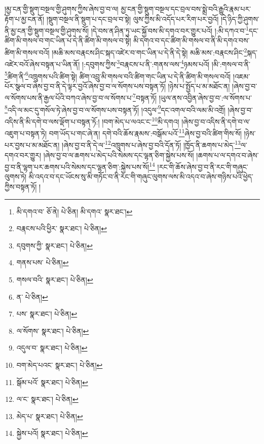 །མྱ་ངན་གྱི་སྡུག་བསྔལ་གྱི་ཤུགས་ཀྱིས་ཞེས་བྱ་བ་ལ། མྱ་ངན་གྱི་སྡུག་བསྔལ་དང་བྲལ་བས་སྨྲེ་བའི་རྒྱུའི་རྣམ་པར་རྟོག་པ་མྱ་ངན་ནོ། །སྡུག་བསྔལ་ནི་སྡུག་པ་དང་བྲལ་བ་སྟེ། ལུས་ཀྱིས་མི་འདོད་པར་རིག་པར་བྱའོ། །དེ་ཉིད་ཀྱི་ཤུགས་ནི་མྱ་ངན་གྱི་སྡུག་བསྔལ་གྱི་ཤུགས་སོ། །དེ་བས་ན་ཤིན་ཏུ་ཡང་སྐྱོ་བས་མི་དགའ་བར་གྱུར་པའོ། །:མི་དཀའ་བ་\footnote{མི་དགའ་བ་  ཅོ་ནེ།  པེ་ཅིན། མི་དགའ་  སྣར་ཐང་། }དང་ཚིག་མི་གསལ་བ་གང་ཡིན་པ་དེ་ནི་ཚིག་མི་གསལ་བ་སྟེ། མི་དགའ་བ་དང་ཚིག་མི་གསལ་བ་ནི་མི་དགའ་བས་ཚིག་མི་གསལ་བའོ། །མཆི་མས་བརྣངས་ཤིང་སྐད་འཛེར་བ་གང་ཡིན་པ་དེ་ནི་དེ་སྟེ། མཆི་མས་:བརྣངས་ཤིང་\footnote{བརྣངས་པའི་ཕྱིར་  སྣར་ཐང་།  པེ་ཅིན། }སྐད་འཛེར་བའོ་ཞེས་བསྟན་པ་ཡིན་ནོ། །:དབུགས་ཀྱིས་\footnote{དབུགས་ཀྱི་  སྣར་ཐང་།  པེ་ཅིན། }བརྣངས་པ་ནི་:གནས་ལས་\footnote{གནས་པས་  པེ་ཅིན། }ཉམས་པའོ། །མི་:གསལ་བ་ནི་\footnote{གསལ་བའི་  སྣར་ཐང་།  པེ་ཅིན། }ཚིག་ནི་\footnote{ན་  པེ་ཅིན། }འཁྲུགས་པའི་ཚིག་སྟེ། ཚིག་འབྲུ་མི་གསལ་བའི་ཚིག་གང་ཡིན་པ་དེ་ནི་ཚིག་མི་གསལ་བའོ། །འཇམ་པོར་སྩལ་བ་ཞེས་བྱ་བ་ནི་དེ་ལྟར་བྱའོ་ཞེས་བྱ་བ་ལ་སོགས་པས་བསྟན་ཏོ། །ཉེས་པ་སྤྱོད་པ་མ་མཐོང་ན། །ཞེས་བྱ་བ་ལ་སོགས་པས་ནི་རྒྱལ་པོའི་བཀའ་ཞེས་བྱ་བ་ལ་སོགས་པ་\footnote{པས་  སྣར་ཐང་།  པེ་ཅིན། }བསྟན་ཏོ། །ཡུལ་ནས་འབྱིན་ཞེས་བྱ་བ་:ལ་སོགས་པ་\footnote{ལ་སོགས་  སྣར་ཐང་།  པེ་ཅིན། }འདི་ལ་མང་དུ་གསོལ་ཏེ་ཞེས་བྱ་བ་ལ་སོགས་པས་བསྟན་ཏོ། །འདུལ་\footnote{འདུལ་བ་  སྣར་ཐང་།  པེ་ཅིན། }དང་འགལ་བའི་ལམ་མི་འགྲོ། །ཞེས་བྱ་བ་འདིས་ནི་མི་དགེ་བ་ལས་ལྡོག་པ་བསྟན་ཏོ:། །བག་མེད་པ་ལའང་ང་\footnote{བག་མེད་པའང་  སྣར་ཐང་།  པེ་ཅིན། }མི་དགའ། །ཞེས་བྱ་བ་འདིས་ནི་དགེ་བ་ལ་འཇུག་པ་བསྟན་ཏེ། བག་ཡོད་པ་གང་ཞེ་ན། དགེ་བའི་ཆོས་རྣམས་:བསྒོམ་པའོ་\footnote{སྒོམ་པའོ་  སྣར་ཐང་།  པེ་ཅིན། }ཞེས་བྱ་བའི་ཚིག་གིས་སོ། །ཉེས་པར་བྱས་པ་མ་མཐོང་ན། །ཞེས་བྱ་བ་ནི་དེ་ལ་\footnote{ལ་ང་  སྣར་ཐང་།  པེ་ཅིན། }འཁྲུགས་པ་ཞེས་བྱ་བའི་དོན་ཏོ། །ཁྱོད་ནི་ཆགས་པ་མེད་\footnote{མེད་པ་  སྣར་ཐང་།  པེ་ཅིན། }ལ་དགའ་བར་གྱུར། །ཞེས་བྱ་བ་ལ་ཆགས་པ་མེད་པའི་སེམས་དང་ལྷན་ཅིག་སྐྱེས་པས་སོ། །ཆགས་པ་ལ་དགའ་བ་ཞེས་བྱ་བ་ནི་ལྷག་པར་ཆགས་པའི་སེམས་དང་ལྷན་ཅིག་:སྐྱེས་པས་སོ།\footnote{སྐྱེས་པའོ།  སྣར་ཐང་།  པེ་ཅིན། } །རང་གི་ཆོས་ཞེས་བྱ་བ་ནི་རང་གི་གཞུང་ལུགས་ཏེ། མི་འདའ་བ་དང་ཡོངས་སུ་མི་གཏོང་བ་ནི་རང་གི་གཞུང་ལུགས་ལས་མི་འདའ་བ་ཞེས་གཉིས་པའི་ཕྱེད་ཀྱིས་བསྟན་ཏོ། །
